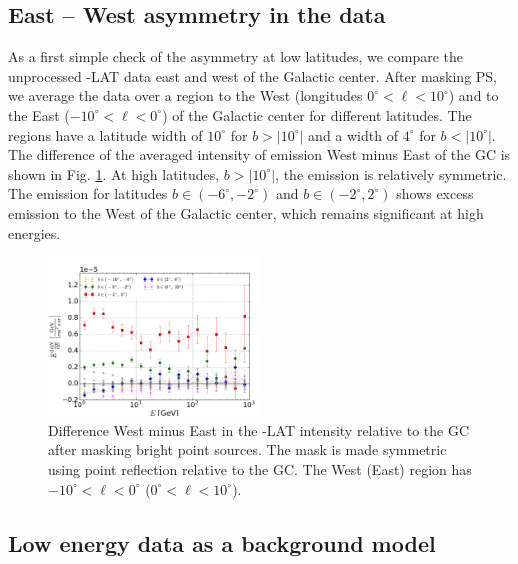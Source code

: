 \subsection{East -- West asymmetry in the data}
\label{sec:data_diff}

As a first simple check of the asymmetry at low latitudes, we compare the unprocessed \Fermi-LAT data east and west of the Galactic center. 
After masking PS, we average the data over a region to the West (longitudes $0^\circ < \ell < 10^\circ$) and to the East ($-10^\circ < \ell  <  0^\circ$) of the Galactic center for different latitudes. The regions have a latitude width of $10^\circ$ for $b >|10^\circ|$ and a width of  $4^\circ$ for  $b <|10^\circ|$. 
The difference of the averaged intensity of emission West minus East of the GC is shown in Fig. \ref{fig:data_diff}. At high latitudes, $b >|10^\circ|$, the emission is relatively symmetric. 
The emission for latitudes $b \in (-6^\circ, -2^\circ)$ and $b \in (-2^\circ, 2^\circ)$ shows excess emission to the West of the Galactic center, 
which remains significant at high energies. 


\begin{figure}[h]
 \includegraphics[width=0.5\textwidth]{plots/Difference_data_for_different_latitudes.pdf}
 \caption{Difference West minus East in the \Fermi-LAT intensity relative to the GC after masking bright point sources.
 The mask is made symmetric using point reflection relative to the GC.
 The West (East) region has $-10^\circ < \ell <0^\circ$ ($0^\circ < \ell <10^\circ$). }
 \label{fig:data_diff}
\end{figure}

\subsection{Low energy data as a background model}
\label{sec:le_data_model}

